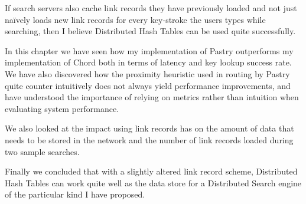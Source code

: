 If search servers also cache link records they have previously loaded and not just na\"ively loads new link records for every key-stroke the users types while searching, then I believe Distributed Hash Tables can be used quite successfully.

\mbox{}

In this chapter we have seen how my implementation of Pastry outperforms my implementation of Chord both in terms of latency and key lookup success rate.
We have also discovered how the proximity heuristic used in routing by Pastry quite counter intuitively does not always yield performance improvements, and have understood the importance of relying on metrics rather than intuition when evaluating system performance.

We also looked at the impact using link records has on the amount of data that needs to be stored in the network and the number of link records loaded during two sample searches.

Finally we concluded that with a slightly altered link record scheme, Distributed Hash Tables can work quite well as the data store for a Distributed Search engine of the particular kind I have proposed.
